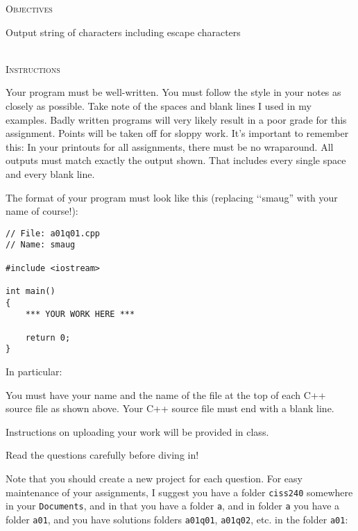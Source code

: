 


\renewcommand\TITLE{Assignment 1}
\usepackage{import}


\topmatter


\textsc{Objectives}
 \begin{myenum}
 \li Output string of characters including escape characters
 \end{myenum}
\mbox{}\\

\textsc{Instructions}
\begin{enumerate}[topsep=0pt,nosep]
\li Your program must be well-written. 
    You must follow the style in your notes as closely as possible. 
    Take note of the spaces and blank lines I used in my examples. 
    Badly written programs will very likely result in a poor grade for this 
    assignment. 
    Points will be taken off for sloppy work. 
\li It's important to remember this: In your printouts for all assignments, 
    there must be no wraparound.
\li All outputs must match exactly the output shown. 
    That includes every single space and every blank line.

\li The format of your program must look like this
(replacing \lq\lq smaug'' with your name of course!):
\begin{Verbatim}[frame=single,fontsize=\small]
// File: a01q01.cpp
// Name: smaug

#include <iostream>

int main()
{
    *** YOUR WORK HERE ***

    return 0;
}
\end{Verbatim}
In particular:
\begin{myenum}
\li You must have your name and the name of the file at the top of each 
    C++ source file as shown above.
\li Your C++ source file must end with a blank line.
\end{myenum}

\li Instructions on uploading your work will be provided in class.

\end{enumerate}


Read the questions carefully before diving in!

Note that you should create a new project for each question. 
For easy maintenance of your assignments, 
I suggest you have a folder \verb!ciss240! somewhere in your 
\verb!Documents!, and in that you have a folder \verb!a!, 
and in folder \verb!a! you have a folder \verb!a01!, 
and you have solutions folders \verb!a01q01!, \verb!a01q02!, etc. in the 
folder \verb!a01!:

